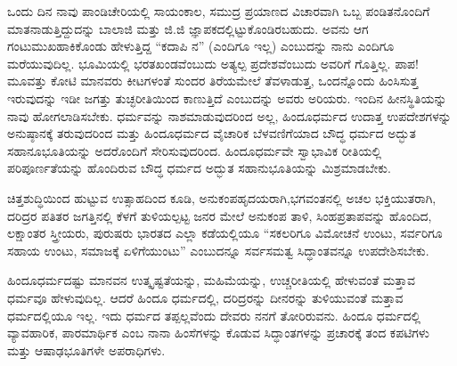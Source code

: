 ಒಂದು ದಿನ ನಾವು ಪಾಂಡಿಚೇರಿಯಲ್ಲಿ ಸಾಯಂಕಾಲ, ಸಮುದ್ರ ಪ್ರಯಾಣದ ವಿಚಾರವಾಗಿ ಒಬ್ಬ ಪಂಡಿತನೊಂದಿಗೆ ಮಾತನಾಡುತ್ತಿದ್ದುದನ್ನು ಬಾಲಾಜಿ ಮತ್ತು ಜಿ.ಜಿ ಜ್ಞಾಪಕದಲ್ಲಿಟ್ಟುಕೊಂಡಿರಬಹುದು. ಅವನು ಆಗ ಗಂಟುಮುಖಹಾಕಿಕೊಂಡು ಹೇಳುತ್ತಿದ್ದ “ಕದಾಪಿ ನ” (ಎಂದಿಗೂ ಇಲ್ಲ) ಎಂಬುದನ್ನು ನಾನು ಎಂದಿಗೂ ಮರೆಯುವುದಿಲ್ಲ. ಭೂಮಿಯಲ್ಲಿ ಭರತಖಂಡವೆಂಬುದು ಅತ್ಯಲ್ಪ ಪ್ರದೇಶವೆಂಬುದು ಅವರಿಗೆ ಗೊತ್ತಿಲ್ಲ. ಪಾಪ!ಮೂವತ್ತು ಕೋಟಿ ಮಾನವರು ಕೀಟಗಳಂತೆ ಸುಂದರ ತಿರೆಯಮೇಲೆ ತೆವಳಾಡುತ್ತ, ಒಂದನ್ನೊಂದು ಹಿಂಸಿಸುತ್ತ ಇರುವುದನ್ನು ಇಡೀ ಜಗತ್ತು ತುಚ್ಛರೀತಿಯಿಂದ ಕಾಣುತ್ತಿದೆ ಎಂಬುದನ್ನು ಅವರು ಅರಿಯರು. ಇಂದಿನ ಹೀನಸ್ಥಿತಿಯನ್ನು ನಾವು ಹೋಗಲಾಡಿಸಬೇಕು. ಧರ್ಮವನ್ನು ನಾಶಮಾಡುವುದರಿಂದ ಅಲ್ಲ, ಹಿಂದೂಧರ್ಮದ ಉದಾತ್ತ ಉಪದೇಶಗಳನ್ನು ಅನುಷ್ಠಾನಕ್ಕೆ ತರುವುದರಿಂದ ಮತ್ತು ಹಿಂದೂಧರ್ಮದ ವೈಚಾರಿಕ ಬೆಳವಣಿಗೆಯಾದ ಬೌದ್ಧ ಧರ್ಮದ ಅದ್ಭುತ ಸಹಾನೂಭೂತಿಯನ್ನು ಅದರೊಂದಿಗೆ ಸೇರಿಸುವುದರಿಂದ. ಹಿಂದೂಧರ್ಮವೇ ಸ್ವಾಭಾವಿಕ ರೀತಿಯಲ್ಲಿ ಪರಿಪೂರ್ಣತೆಯನ್ನು ಹೊಂದಿರುವ ಬೌದ್ಧ ಧರ್ಮದ ಅದ್ಭುತ ಸಹಾನುಭೂತಿಯನ್ನು ಮಿಶ್ರಮಾಡಬೇಕು.

ಚಿತ್ತಶುದ್ಧಿಯಿಂದ ಹುಟ್ಟುವ ಉತ್ಸಾಹದಿಂದ ಕೂಡಿ, ಅನುಕಂಪಹೃದಯರಾಗಿ,\break ಭಗವಂತನಲ್ಲಿ ಅಚಲ ಭಕ್ತಿಯುತರಾಗಿ, ದರಿದ್ರರ ಪತಿತರ ಜಗತ್ತಿನಲ್ಲಿ ಕೆಳಗೆ ತುಳಿಯಲ್ಪಟ್ಟ ಜನರ ಮೇಲೆ ಅನುಕಂಪ ತಾಳಿ, ಸಿಂಹಪ್ರತಾಪವನ್ನು ಹೊಂದಿದ, ಲಕ್ಷಾಂತರ ಸ್ತ್ರೀಯರು, ಪುರುಷರು ಭಾರತದ ಎಲ್ಲಾ ಕಡೆಯಲ್ಲಿಯೂ “ಸಕಲರಿಗೂ ವಿಮೋಚನೆ ಉಂಟು, ಸರ್ವರಿಗೂ ಸಹಾಯ ಉಂಟು, ಸಮಾಜಕ್ಕೆ ಏಳಿಗೆಯುಂಟು” ಎಂಬುದನ್ನೂ ಸರ್ವಸಮತ್ವ ಸಿದ್ಧಾಂತವನ್ನೂ ಉಪದೇಶಿಸಬೇಕು.

ಹಿಂದೂಧರ್ಮದಷ್ಟು ಮಾನವನ ಉತ್ಕೃಷ್ಟತೆಯನ್ನು, ಮಹಿಮೆಯನ್ನು, ಉಚ್ಚರೀತಿಯಲ್ಲಿ ಹೇಳುವಂತೆ ಮತ್ತಾವ ಧರ್ಮವೂ ಹೇಳುವುದಿಲ್ಲ. ಆದರೆ ಹಿಂದೂ ಧರ್ಮದಲ್ಲಿ, ದರಿದ್ರರನ್ನು ದೀನರನ್ನು ತುಳಿಯುವಂತೆ ಮತ್ತಾವ ಧರ್ಮದಲ್ಲಿಯೂ ಇಲ್ಲ. ಇದು ಧರ್ಮದ ತಪ್ಪಲ್ಲವೆಂದು ದೇವರು ನನಗೆ ತೋರಿರುವನು. ಹಿಂದೂ ಧರ್ಮದಲ್ಲಿ ವ್ಯಾವಹಾರಿಕ, ಪಾರಮಾರ್ಥಿಕ ಎಂಬ ನಾನಾ ಹಿಂಸೆಗಳನ್ನು ಕೊಡುವ ಸಿದ್ಧಾಂತಗಳನ್ನು ಪ್ರಚಾರಕ್ಕೆ ತಂದ ಕಪಟಿಗಳು ಮತ್ತು ಆಷಾಢಭೂತಿಗಳೇ ಅಪರಾಧಿಗಳು.

\newpage

